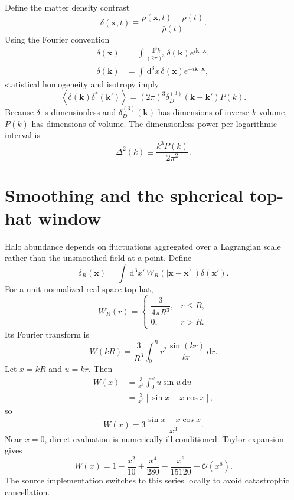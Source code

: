 \documentclass[11pt]{article}
\newcommand{\dd}{\,\mathrm d}
\begin{document}
Define the matter density contrast
\begin{equation}
\delta(\bm x,t)\equiv \frac{\rho(\bm x,t)-\bar\rho(t)}{\bar\rho(t)}.
\end{equation}
Using the Fourier convention
\begin{align}
\delta(\bm x) &= \int \frac{\dd^3k}{(2\pi)^3}\,\delta(\bm k)e^{i\bm k\cdot\bm x},\\
\delta(\bm k) &= \int \dd^3x\,\delta(\bm x)e^{-i\bm k\cdot\bm x},
\end{align}
statistical homogeneity and isotropy imply
\begin{equation}
\left\langle \delta(\bm k)\delta^*(\bm k')\right\rangle
=(2\pi)^3\delta_D^{(3)}(\bm k-\bm k')P(k).
\end{equation}
Because $\delta$ is dimensionless and $\delta_D^{(3)}(\bm k)$ has dimensions of inverse $k$-volume, $P(k)$ has dimensions of volume. The dimensionless power per logarithmic interval is
\begin{equation}
\boxed{\Delta^2(k)\equiv \frac{k^3P(k)}{2\pi^2}}.
\end{equation}

\section{Smoothing and the spherical top-hat window}

Halo abundance depends on fluctuations aggregated over a Lagrangian scale rather than the unsmoothed field at a point. Define
\begin{equation}
\delta_R(\bm x)=\int \dd^3x'\,W_R(|\bm x-\bm x'|)\delta(\bm x').
\end{equation}
For a unit-normalized real-space top hat,
\begin{equation}
W_R(r)=\begin{cases}
\dfrac{3}{4\pi R^3}, & r\le R,\\[4pt]
0, & r>R.
\end{cases}
\end{equation}
Its Fourier transform is
\begin{equation}
W(kR)=\frac{3}{R^3}\int_0^R r^2\frac{\sin(kr)}{kr}\dd r.
\end{equation}
Let $x=kR$ and $u=kr$. Then
\begin{align}
W(x)
&=\frac{3}{x^3}\int_0^x u\sin u\dd u\\
&=\frac{3}{x^3}\left[\sin x-x\cos x\right],
\end{align}
so
\begin{equation}
\boxed{W(x)=3\frac{\sin x-x\cos x}{x^3}}.
\end{equation}
Near $x=0$, direct evaluation is numerically ill-conditioned. Taylor expansion gives
\begin{equation}
\boxed{W(x)=1-\frac{x^2}{10}+\frac{x^4}{280}-\frac{x^6}{15120}+\mathcal O(x^8)}.
\end{equation}
The source implementation switches to this series locally to avoid catastrophic cancellation.
\end{document}
